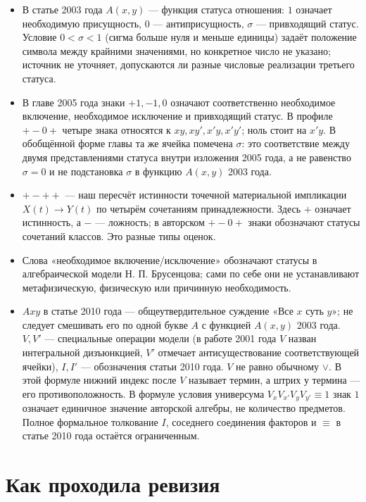 \documentclass[12pt,a4paper]{article}
\begin{document}
\begin{itemize}
\item В статье 2003 года \(A(x,y)\) — функция статуса отношения: \(1\) означает необходимую присущность, \(0\) — антиприсущность, \(\sigma\) — привходящий статус. Условие \(0<\sigma<1\) (сигма больше нуля и меньше единицы) задаёт положение символа между крайними значениями, но конкретное число не указано; источник не уточняет, допускаются ли разные числовые реализации третьего статуса.
\item В главе 2005 года знаки \(+1,-1,0\) означают соответственно необходимое включение, необходимое исключение и привходящий статус. В профиле \(+-0+\) четыре знака относятся к \(xy,xy',x'y,x'y'\); ноль стоит на \(x'y\). В обобщённой форме главы та же ячейка помечена \(\sigma\): это соответствие между двумя представлениями статуса внутри изложения 2005 года, а не равенство \(\sigma=0\) и не подстановка \(\sigma\) в функцию \(A(x,y)\) 2003 года.
\item \(+-++\) — наш пересчёт истинности точечной материальной импликации \(X(t)\to Y(t)\) по четырём сочетаниям принадлежности. Здесь \(+\) означает истинность, а \(-\) — ложность; в авторском \(+-0+\) знаки обозначают статусы сочетаний классов. Это разные типы оценок.
\item Слова «необходимое включение/исключение» обозначают статусы в алгебраической модели Н. П. Брусенцова; сами по себе они не устанавливают метафизическую, физическую или причинную необходимость.
\item \(Axy\) в статье 2010 года — общеутвердительное суждение «Все \(x\) суть \(y\)»; не следует смешивать его по одной букве \(A\) с функцией \(A(x,y)\) 2003 года. \(V,V'\) — специальные операции модели (в работе 2001 года \(V\) назван интегральной дизъюнкцией, \(V'\) отмечает антисуществование соответствующей ячейки), \(I,I'\) — обозначения статьи 2010 года. \(V\) не равно обычному \(\lor\). В этой формуле нижний индекс после \(V\) называет термин, а штрих у термина — его противоположность. В формуле условия универсума \(V_xV_{x'}V_yV_{y'}\equiv1\) знак \(1\) означает единичное значение авторской алгебры, не количество предметов. Полное формальное толкование \(I\), соседнего соединения факторов и \(\equiv\) в статье 2010 года остаётся ограниченным.
\end{itemize}

\section{Как проходила ревизия}
\end{document}
